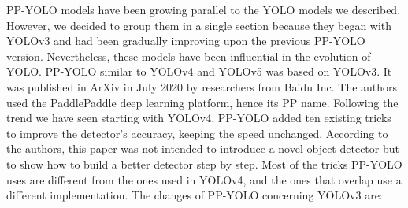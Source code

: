 \documentclass{article}
\begin{document}
PP-YOLO models have been growing parallel to the YOLO models we described. However, we decided to group them in a single section because they began with YOLOv3 and had been gradually improving upon the previous PP-YOLO version. Nevertheless, these models have been influential in the evolution of YOLO. PP-YOLO \cite{long2020pp} similar to YOLOv4 and YOLOv5 was based on YOLOv3. It was published in ArXiv in July 2020 by researchers from Baidu Inc. The authors used the PaddlePaddle \cite{ma2019paddlepaddle} deep learning platform, hence its PP name. Following the trend we have seen starting with YOLOv4, PP-YOLO added ten existing tricks to improve the detector’s accuracy, keeping the speed unchanged. According to the authors, this paper was not intended to introduce a novel object detector but to show how to build a better detector step by step. Most of the tricks PP-YOLO uses are different from the ones used in YOLOv4, and the ones that overlap use a different implementation. The changes of PP-YOLO concerning YOLOv3 are:
\end{document}
